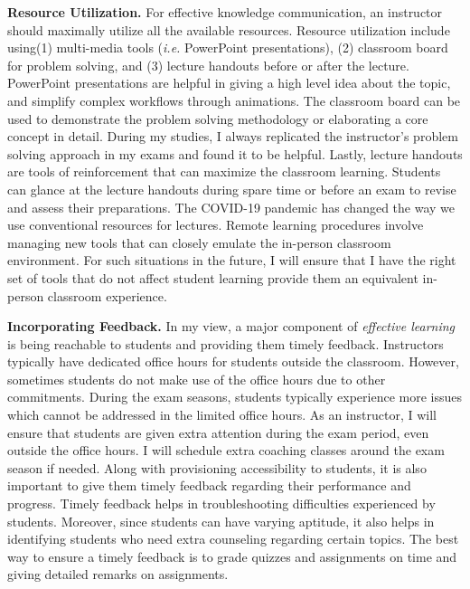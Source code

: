 \documentclass{NSF}
\newcommand{\BfPara}[1]{{\noindent\textbf{#1.}}\xspace}
\newcommand{\ie}{{\em i.e.}\xspace}
\begin{document}
\vspace{1mm}
\BfPara{Resource Utilization} For effective knowledge communication, an instructor should maximally utilize all the available resources. Resource utilization include using(1) multi-media tools (\ie PowerPoint presentations), (2) classroom board for problem solving, and (3) lecture handouts before or after the lecture. PowerPoint presentations are helpful in giving a high level idea about the topic, and simplify complex workflows through animations. The classroom board can be used to demonstrate the problem solving methodology or elaborating a core concept in detail. During my studies, I always replicated the instructor's problem solving approach in my exams and found it to be helpful. Lastly, lecture handouts are tools of reinforcement that can maximize the classroom learning. Students can glance at the lecture handouts during spare time or before an exam to revise and assess their preparations. The COVID-19 pandemic has changed the way we use conventional resources for lectures. Remote learning procedures involve managing new tools that can closely emulate the in-person classroom environment. For such situations in the future, I will ensure that I have the right set of tools that do not affect student learning provide them an equivalent in-person classroom experience. 

\vspace{1mm}
\BfPara{Incorporating Feedback} In my view, a major component of {\em effective learning} is being reachable to students and providing them timely feedback. Instructors typically have dedicated office hours for students outside the classroom. However, sometimes students do not make use of the office hours due to other commitments. During the exam seasons, students typically experience more issues which cannot be addressed in the limited office hours. As an instructor, I will ensure that students are given extra attention during the exam period, even outside the office hours. I will schedule extra coaching classes around the exam season if needed. Along with provisioning accessibility to students, it is also important to give them timely feedback regarding their performance and progress. Timely feedback helps in troubleshooting difficulties experienced by students. Moreover, since students can have varying aptitude, it also helps in identifying students who need extra counseling regarding certain topics. The best way to ensure a timely feedback is to grade quizzes and assignments on time and giving detailed remarks on assignments. 
\end{document}

